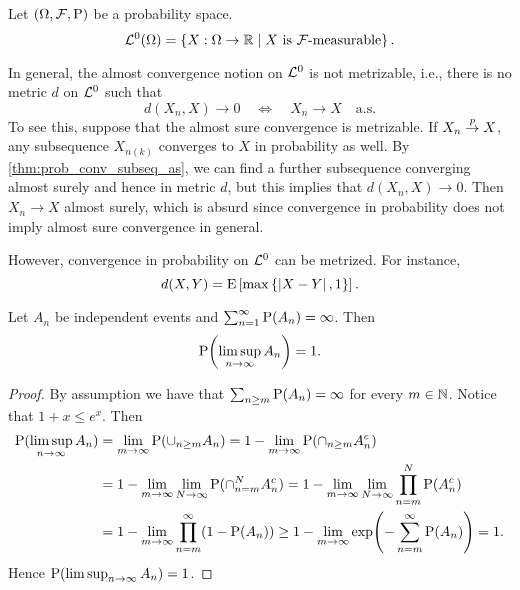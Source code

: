 \begin{definition}
    Let $(\Omega,\F, \P)$ be a probability space. 
    \begin{equation*}
        \L^0(\Omega) = \Set{X:\Omega\to\R}{X\text{ is $\F$-measurable}}. 
    \end{equation*}
\end{definition}
\begin{remark}
    In general, the almost convergence notion on $\L^0$ is not metrizable, 
    i.e., there is no metric $d$ on $\L^0$ such that 
    \begin{equation*}
        d(X_n, X)\to 0
        \quad\Leftrightarrow\quad 
        X_n\to X\quad\text{a.s.}
    \end{equation*} 
    To see this, suppose that the almost sure convergence is metrizable. 
    If $X_n\pto X$, any subsequence $X_{n(k)}$ converges to $X$ in probability 
    as well. By \cref{thm:prob_conv_subseq_as}, we can find a further subsequence 
    converging almost surely and hence in metric $d$, but this implies that 
    $d(X_n, X)\to 0$. Then $X_n\to X$ almost surely, which is absurd since 
    convergence in probability does not imply almost sure convergence 
    in general. 

    However, convergence in probability on $\L^0$ can be metrized. For instance, 
    \begin{equation*}
        d(X,Y) = \E\sbrc{\max\set{\abs{X-Y}, 1}}. 
    \end{equation*}
\end{remark}

\begin{theorem}
    Let $A_n$ be independent events and $\sum_{n=1}^\infty\P(A_n)=\infty$. 
    Then 
    \begin{equation*}
        \P\pth{\limsup_{n\to\infty} A_n} = 1. 
    \end{equation*}
\end{theorem}
\begin{proof}
    By assumption we have that $\sum_{n\geq m}\P(A_n) = \infty$ for every 
    $m\in\N$. Notice that $1+x\leq e^x$. Then  
    \begin{equation*}
        \begin{split}
            \P(\limsup_{n\to\infty}A_n) &= \lim_{m\to\infty}\P(\cup_{n\geq m}A_n) 
            = 1 - \lim_{m\to\infty}\P(\cap_{n\geq m}A_n^c) \\ 
            &= 1 - \lim_{m\to\infty}\lim_{N\to\infty}\P(\cap_{n= m}^NA_n^c) 
            = 1 - \lim_{m\to\infty}\lim_{N\to\infty}\prod_{n=m}^N\P(A_n^c) \\ 
            &= 1 - \lim_{m\to\infty}\prod_{n=m}^\infty(1 - \P(A_n)) 
            \geq 1 - \lim_{m\to\infty}\exp\pth{-\sum_{n=m}^\infty\P(A_n)}
            = 1. 
        \end{split}
    \end{equation*}
    Hence $\P(\limsup_{n\to\infty}A_n) = 1$. 
\end{proof}


